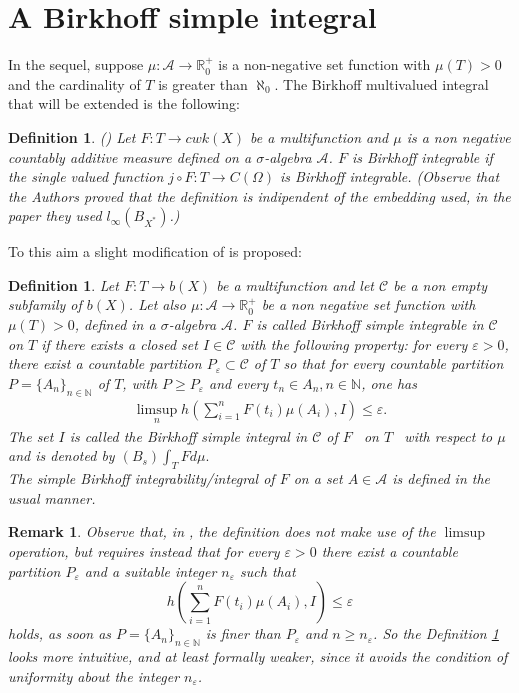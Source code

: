 \documentclass[11pt,a4paper,twoside]{amsart}
\newtheorem{definition}[theorem]{Definition}
\newtheorem{remark}[theorem]{Remark}
\begin{document}
\section{A Birkhoff simple integral}\label{three}
In the sequel, suppose $\mu :\mathcal{A}\rightarrow \mathbb{R}_0^+$ is a
non-negative set function with $\mu (T)>0$
and the cardinality of $T$ is greater than $\aleph_0$.
 The Birkhoff multivalued integral that will be extended is the following:
\begin{definition}\rm \label{2.1cr2004} (\cite[Definition 2.1]{cr2004})
Let $F: T \to cwk(X)$ be a multifunction and
$\mu$ is a non negative countably additive measure 
defined on a $\sigma$-algebra  $\mathcal{A}$.
$F$ is Birkhoff integrable if the single valued function $j \circ F: T \to C(\Omega)$ is Birkhoff integrable.
(Observe that the Authors proved that the definition is indipendent of the embedding used, in the paper they used  $l_{\infty}(B_{X^*})$.)
\end{definition}
To this aim  a slight modification of  \cite[Definition 3.1]{cgsub1} is proposed:
\begin{definition}\label{ex3.5} \rm 
 Let $F:T\rightarrow b(X)$ be a
multifunction and let $\mathcal{C}$ be a non empty subfamily of  $b(X)$.  Let also $\mu:\mathcal{A}\to \mathbb{R}_0^+$ be a
non negative set function with $\mu(T)>0$, defined in a $\sigma$-algebra  $\mathcal{A}$. $F$
is called {\em Birkhoff simple integrable} in $\mathcal{C}$ on 
$T$ if there exists a closed set $I\in \mathcal{C} $ with the following property: for
every $\varepsilon >0$, there exist a countable partition
 $P_{\varepsilon }\subset {\mathcal C}$
of $T$ 
so that for every countable
partition $P=\{A_{n}\}_{n\in \mathbb{N}}$ of $T$, with $P\geq P_{\varepsilon
}$ and every $t_{n}\in A_{n},n\in \mathbb{N}$, one has 
\begin{eqnarray}\label{maxlim1}
 \limsup_n h\left(\sum_{i=1}^nF(t_i)\mu(A_i),I\right)\leq {\varepsilon}.
\end{eqnarray}
The set $I$ is called the \textit{Birkhoff simple integral in $\mathcal{C}$ of }$F$ 
\textit{\ on }$T$ \textit{\ with respect to} $\mu $ and is denoted by $(B_s)\int_{T}Fd\mu .$
\\
The simple Birkhoff integrability/integral of $F$ on a set $A\in \mathcal{A}$ is defined in the usual 
 manner.
\end{definition}
\begin{remark}\rm 
Observe that, in \cite{cgsub1}, the definition does not make use of the $\limsup$ operation, but requires instead that for every $\varepsilon>0$ there exist a countable partition $P_{\varepsilon }$ and a suitable integer $n_{\varepsilon}$ such that 
$$h\left(\sum_{i=1}^nF(t_i)\mu(A_i),I\right)\leq {\varepsilon}$$
holds, as soon as $P=\{A_{n}\}_{n\in \mathbb{N}}$ is finer than 
$P_{\varepsilon }$  and $n\geq n_{\varepsilon}$.
So the Definition \ref{ex3.5} looks more intuitive, and at least formally weaker, since it avoids the condition of uniformity about the integer $n_{\varepsilon}$.\\
\end{remark}
\end{document}
